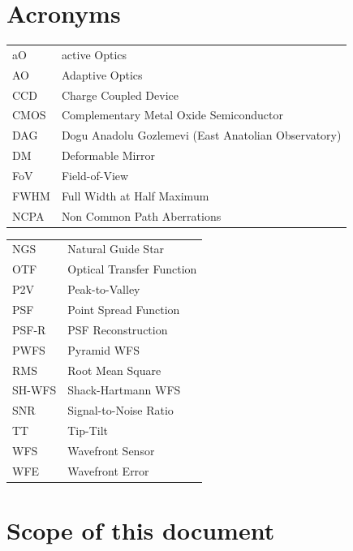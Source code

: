 \documentclass[12pt,a4paper]{article}
\begin{document}

\setlength{\parindent}{0pt}%


\section*{Acronyms}
\afterpage{\cfoot{\thepage}}

\begin{minipage}[c]{0.5\textwidth}
\begin{center}
\begin{tabular}{p{13mm}|p{55mm}}
aO & active Optics \\
AO & Adaptive Optics \\
CCD & Charge Coupled Device\\
CMOS & Complementary Metal Oxide Semiconductor\\
DAG & Dogu Anadolu Gozlemevi (East Anatolian Observatory)\\
DM & Deformable Mirror\\
FoV & Field-of-View\\
FWHM & Full Width at Half Maximum\\
NCPA & Non Common Path Aberrations
\end{tabular}
\end{center}
\end{minipage}
\begin{minipage}[c]{0.5\textwidth}
\begin{center}
\begin{tabular}{p{16mm}|p{55mm}}
NGS & Natural Guide Star \\
OTF & Optical Transfer Function\\
P2V & Peak-to-Valley\\
PSF & Point Spread Function\\
PSF-R & PSF Reconstruction\\
PWFS & Pyramid WFS\\
RMS & Root Mean Square\\
SH-WFS & Shack-Hartmann WFS\\
SNR & Signal-to-Noise Ratio\\
TT & Tip-Tilt\\
WFS & Wavefront Sensor\\
WFE & Wavefront Error
\end{tabular}
\end{center}
\end{minipage}
\newpage

\section{Scope of this document}
\end{document}
